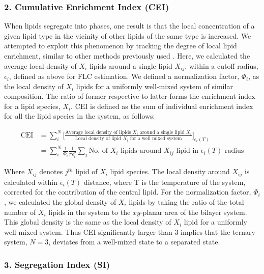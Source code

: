 \documentclass{biophys-new}
\begin{document}
\subsubsection*{2. Cumulative Enrichment Index (CEI)}

When lipids segregate into phases, one result is that the local concentration of a given lipid type in the vicinity of other lipids of the same type is increased. We attempted to exploit this phenomenon by tracking the degree of local lipid enrichment, similar to other methods previously used \cite{Gu2019, Gu2020}.
Here, we calculated the average local density of $X_i$ lipids around a single lipid $X_{ij}$, within a cutoff radius, $\epsilon_i$, defined as above for FLC estimation.
We defined a normalization factor, $\Phi_i$, as the local density of $X_i$ lipids for a uniformly well-mixed system of similar composition.
The ratio of former respective to latter forms the enrichment index for a lipid species, $X_i$.
CEI is defined as the sum of individual enrichment index for all the lipid species in the system, as follows:

\begin{equation}
    \begin{aligned}
    \label{eq:CEI}
    \text{CEI} {}   & = \sum_{i}^{N}\Bigg[\frac{\text{Average local density of lipids $X_i$ around a single lipid $X_i$}}{\text{Local density of lipid $X_i$ for a well mixed system}}\Bigg]_{\text{$\epsilon_i(T)$}} \\
                    & =  \sum_{i}^{N} \frac{1}{\Phi_i}\frac{1}{\text{$\pi\epsilon_i^2$}}\sum_{j}\text{No. of $X_i$ lipids around $X_{ij}$ lipid in $\epsilon_i(T)$ radius}
    \end{aligned}
\end{equation}

Where $X_{ij}$ denotes $j^{th}$ lipid of $X_i$ lipid species.
The local density around $X_{ij}$ is calculated within $\epsilon_i(T)$ distance, where T is the temperature of the system, corrected
for the contribution of the central lipid.
For the normalization factor, $\Phi_i$,  we calculated the global density of $X_i$ lipids by taking the ratio of the total number of $X_i$ lipids in the system to the $xy$-planar area of the bilayer system.
This global density is the same as the local density of $X_{i}$ lipid for a uniformly well-mixed system.
Thus CEI significantly larger than 3 implies that the ternary system, $N=3$, deviates from a well-mixed state to a separated state.

\subsubsection*{3. Segregation Index (SI)}
\end{document}
